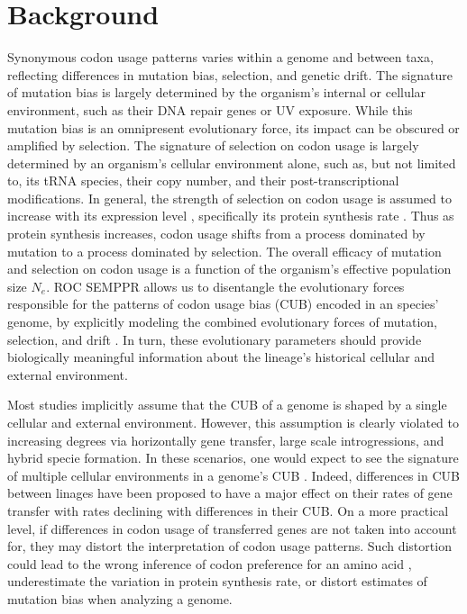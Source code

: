 \documentclass[doublespacing,linenumbers]{bmcart-modified}
\newcommand{\ROC}{ROC SEMPPR\xspace}
\newcommand{\Ne}{\ensuremath{N_e}\xspace}
\begin{document}
\section*{Background}
Synonymous codon usage patterns varies within a genome and between taxa, reflecting differences in mutation bias, selection, and genetic drift.
The signature of mutation bias is largely determined by the organism's internal or cellular environment, such as their DNA repair genes or UV exposure.
While this mutation bias is an omnipresent evolutionary force, its impact can be obscured or amplified by selection. 
The signature of selection on codon usage is largely determined by an organism's cellular environment alone, such as, but not limited to, its tRNA species, their copy number, and their post-transcriptional modifications.
In general, the strength of selection on codon usage is assumed to increase with its expression level \citep{gouy1982, ikemura1985, bulmer1990}, specifically its protein synthesis rate \citep{gilchrist2007}.
Thus as protein synthesis increases, codon usage shifts from a process dominated by mutation to a process dominated by selection.
The overall efficacy of mutation and selection on codon usage is a function of the organism's effective population size $\Ne$.
\ROC allows us to disentangle the evolutionary forces responsible for the patterns of codon usage bias \citep{sharp1987, Wright1990, sharp1993} (CUB) encoded in an species' genome, by explicitly modeling the combined evolutionary forces of mutation, selection, and drift \citep{gilchrist2007, ShahAndGilchrist2011, wallace2013, gilchrist2015}.
In turn, these evolutionary parameters should provide biologically meaningful information about the lineage's historical cellular and external environment.

Most studies implicitly assume that the CUB of a genome is shaped by a single cellular and external environment. 
However, this assumption is clearly violated to increasing degrees via horizontally gene transfer, large scale introgressions, and hybrid specie formation.
In these scenarios, one would expect to see the signature of multiple cellular environments in a genome's CUB \citep{medigue1991, lawrence1997}.
Indeed, differences in CUB between linages have been proposed to have a major effect on their rates of gene transfer with rates declining with differences in their CUB.
On a more practical level, if differences in codon usage of transferred genes are not taken into account for, they may distort the interpretation of codon usage patterns.
Such distortion could lead to the wrong inference of codon preference for an amino acid \citep{ShahAndGilchrist2011, gilchrist2015}, underestimate the variation in protein synthesis rate, or distort estimates of mutation bias when analyzing a genome.
\end{document}
